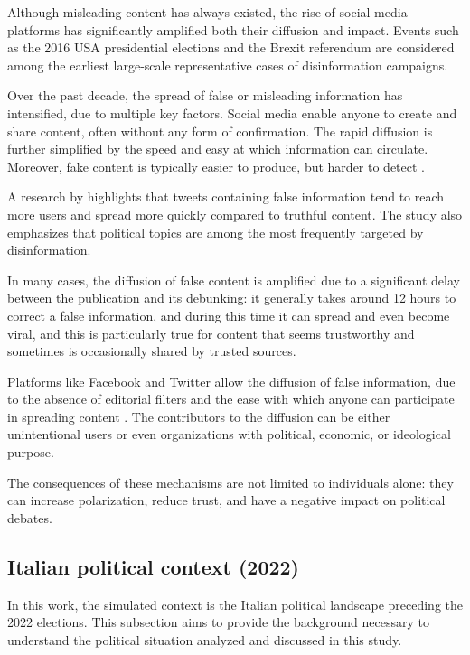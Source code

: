 Although misleading content has always existed, the rise of social media platforms has significantly amplified both their diffusion and impact. 
Events such as the 2016 USA presidential elections and the Brexit referendum are considered among the earliest large-scale representative cases of disinformation campaigns.

Over the past decade, the spread of false or misleading information has intensified, due to multiple key factors.
Social media enable anyone to create and share content, often without any form of confirmation. The rapid diffusion is further simplified by the speed and easy at which information can circulate.
Moreover, fake content is typically easier to produce, but harder to detect \cite{aimeur2023fake}. 

\medskip
A research by \citet{kumar2018falseinformationwebsocial} highlights that tweets containing false information tend to reach more users and spread more quickly compared to truthful content. The study also emphasizes that political topics are among the most frequently targeted by disinformation.

In many cases, the diffusion of false content is amplified due to a significant delay between the publication and its debunking: it generally takes around 12 hours to correct a false information, and during this time it can spread and even become viral, and this is particularly true for content that seems trustworthy and sometimes is occasionally shared by trusted sources.

\medskip
Platforms like Facebook and Twitter allow the diffusion of false information, due to the absence of editorial filters and the ease with which anyone can participate in spreading content \cite{hilary2021social}.
The contributors to the diffusion can be either unintentional users or even organizations with political, economic, or ideological purpose.

The consequences of these mechanisms are not limited to individuals alone: they can increase polarization, reduce trust, and have a negative impact on political debates.



\subsection{Italian political context (2022)} %
In this work, the simulated context is the Italian political landscape preceding the 2022 elections.
This subsection aims to provide the background necessary to understand the political situation analyzed and discussed in this study.

